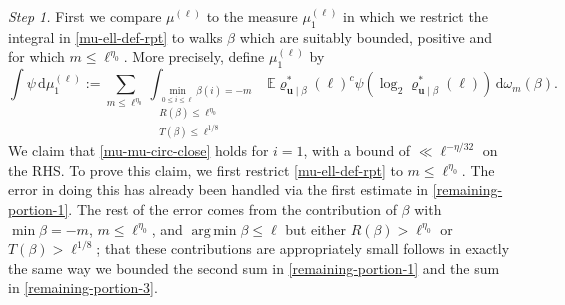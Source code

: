 \documentclass[11pt,reqno]{amsart}
\DeclareMathOperator*{\argmin}{arg\,min}
\numberwithin{equation}{section}
\theoremstyle{definition}
\theoremstyle{remark}
\newcommand{\mb}{\mathbb}
\newcommand{\mbf}{\mathbf}
\renewcommand{\le}{\leqslant}
\begin{document}
\emph{Step 1.}  First we compare $\mu^{(\ell)}$ to the measure $\mu_1^{(\ell)}$ in which we restrict the integral in \cref{mu-ell-def-rpt} to walks $\beta$ which are suitably bounded, positive and for which $m \le \ell^{\eta_0}$. More precisely, define $\mu_1^{(\ell)}$ by
\[ \int \psi \, \mathrm{d} \mu_1^{(\ell)} := \sum_{m \le \ell^{\eta_0}}\int_{\substack{\min_{0 \le i \le \ell} \beta(i) = -m \\ R(\beta) \le \ell^{\eta_0} \\ T(\beta) \le \ell^{1/8}}} \mb{E} \varrho^*_{\mbf{u} \mid \beta}(\ell)^c \psi (\log_2 \varrho^*_{\mbf{u} \mid \beta}(\ell)) \, \mathrm{d}\omega_m(\beta).\]
We claim that \cref{mu-mu-circ-close} holds for $i = 1$, with a bound of $\ll \ell^{-\eta/32}$ on the RHS. To prove this claim, we first restrict \cref{mu-ell-def-rpt} to $m \le \ell^{\eta_0}$. The error in doing this has already been handled via the first estimate in \cref{remaining-portion-1}. The rest of the error comes from the contribution of $\beta$ with
$\min \beta = -m$, $m \le \ell^{\eta_0}$, and $\argmin \beta \le \ell$ but either $R(\beta) > \ell^{\eta_0}$ or $T(\beta) > \ell^{1/8}$; that these contributions are appropriately small follows in exactly the same way we bounded the second sum in \cref{remaining-portion-1} and the sum in \cref{remaining-portion-3}. 

\vspace*{10pt}
\end{document}
